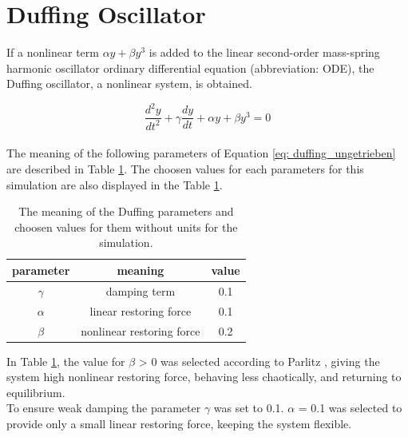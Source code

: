 \documentclass[oneside,10pt,a4paper]{report}
\begin{document}
		\section{Duffing Oscillator}
		If a nonlinear term $\alpha y + \beta y^3$ is added to the linear second-order mass-spring harmonic oscillator ordinary differential equation (abbreviation: ODE), the Duffing oscillator\cite{twist_paper}, a nonlinear system, is obtained.
		
		\begin{equation}\label{eq: duffing_ungetrieben}
			\frac{d^2y}{dt^2} + \gamma \frac{dy}{dt} + \alpha y + \beta y^3 = 0
		\end{equation}
		\\
		The meaning of the following parameters of Equation \ref{eq: duffing_ungetrieben} are described in Table \ref{tab: duffing_ungetriebene_parameter}. The choosen values for each parameters for this simulation are also displayed in the Table \ref{tab: duffing_ungetriebene_parameter}.
		
			\begin{table}[H]
			\centering
			\caption{The meaning of the Duffing parameters and choosen values for them without units for the simulation.}
			\label{tab: duffing_ungetriebene_parameter}
			\begin{tabular}{c c c}
				\toprule
				parameter & meaning & value\\
				\midrule
				$\gamma$ & damping term & 0.1\\
				$\alpha$ & linear restoring force & 0.1\\
				$\beta$& nonlinear restoring force & 0.2\cite{Parlitz_p93}\\
				\bottomrule
			\end{tabular}
		\end{table}
		
		In Table \ref{tab: duffing_ungetriebene_parameter}, the value for $\beta$ > 0 was selected according to Parlitz \cite{Parlitz_p93}, giving the system high nonlinear restoring force, behaving less chaotically, and returning to equilibrium. \\
		To ensure weak damping the parameter $\gamma$ was set to 0.1. $\alpha$ = 0.1 was selected to provide only a small linear restoring force, keeping the system flexible.
		
\end{document}
